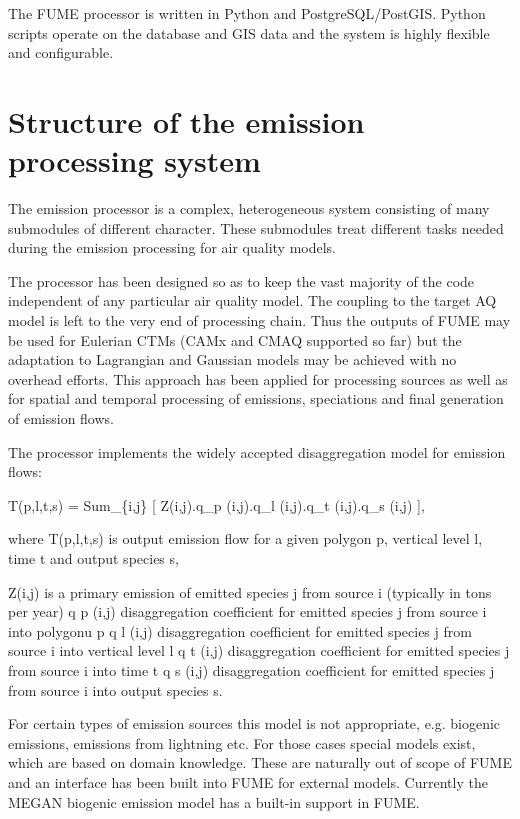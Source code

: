 \documentclass[a4paper,11pt]{article}
\begin{document}
The FUME processor is written in Python and PostgreSQL/PostGIS. Python
scripts operate on the database and GIS data and the system is highly
flexible and configurable.


\section{Structure of the emission processing
system}\label{structure}

The emission processor is a complex, heterogeneous system consisting of
many submodules of different character. These submodules treat different tasks needed during the emission processing for air quality models.

The processor has been designed so as to
keep the vast majority of the code independent of any particular air
quality model. The coupling to the target AQ model is left to the very
end of processing chain. Thus the outputs of FUME may be used for
Eulerian CTMs (CAMx and CMAQ supported so far) but the adaptation to
Lagrangian and Gaussian models may be achieved with no overhead efforts.
This approach has been applied for processing sources as well as for
spatial and temporal processing of emissions, speciations and final
generation of emission flows.

The processor implements the widely accepted disaggregation model for
emission flows:

T(p,l,t,s) = Sum\_\{i,j\} {[} Z(i,j).q\_p (i,j).q\_l (i,j).q\_t
(i,j).q\_s (i,j) {]},

where T(p,l,t,s) is output emission flow for a given polygon p, vertical
level l, time t and output species s,

Z(i,j) is a primary emission of emitted species j from source i
(typically in tons per year) q p (i,j) disaggregation coefficient for
emitted species j from source i into polygonu p q l (i,j) disaggregation
coefficient for emitted species j from source i into vertical level l q
t (i,j) disaggregation coefficient for emitted species j from source i
into time t q s (i,j) disaggregation coefficient for emitted species j
from source i into output species s.

For certain types of emission sources this model is not appropriate,
e.g. biogenic emissions, emissions from lightning etc. For those cases
special models exist, which are based on domain knowledge. These are
naturally out of scope of FUME and an interface has been built into FUME
for external models. Currently the MEGAN biogenic emission model has a
built-in support in FUME.
\end{document}
